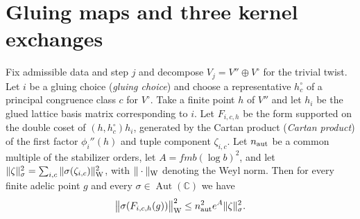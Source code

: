 \section{Gluing maps and three kernel exchanges}
\label{sec:c-gluing}

\begin{lemma}
\label{lem:c-gluing-product-value}
\emitthmsource
Fix admissible data and step $j$ and decompose $V_j=V''\oplus V^\circ$ for the trivial twist. Let $i$ be a gluing choice (\emph{gluing choice}) and choose a representative $h^\circ_c$ of a principal congruence class $c$ for $V^\circ$. Take a finite point $h$ of $V''$ and let $h_i$ be the glued lattice basis matrix corresponding to $i$. Let $F_{i,c,h}$ be the form supported on the double coset of $(h,h^\circ_c)h_i$, generated by the Cartan product (\emph{Cartan product}) of the first factor $\phi_i''(h)$ and tuple component $\zeta_{i,c}$. Let $n_{\rm aut}$ be a common multiple of the stabilizer orders, let $A=fmb(\log b)^2$, and let $\|\zeta\|_\sigma^2=\sum_{i,c}\|\sigma(\zeta_{i,c})\|_{\rm W}^2$, with $\|\cdot\|_{\rm W}$ denoting the Weyl norm. Then for every finite adelic point $g$ and every $\sigma\in\operatorname{Aut}(\mathbb C)$ we have
\[
 \bigl\|\sigma(F_{i,c,h}(g))\bigr\|_{\rm W}^2
 \le n_{\rm aut}^2 e^A\|\zeta\|_\sigma^2.
\]
\end{lemma}


